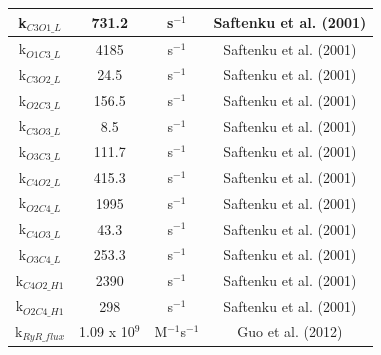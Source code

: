 \documentclass[12pt]{ucsddissertation}
\begin{document}
\begin{table}[h]
\begin{tabular}{cccc}
\hline
k$_{C3O1\_L}$ & 731.2 & s$^{-1}$ & Saftenku et al. (2001) \\
\hline
k$_{O1C3\_L}$ & 4185 & s$^{-1}$ & Saftenku et al. (2001) \\
\hline
k$_{C3O2\_L}$ & 24.5 & s$^{-1}$ & Saftenku et al. (2001) \\
\hline
k$_{O2C3\_L}$ & 156.5 & s$^{-1}$ & Saftenku et al. (2001) \\
\hline
k$_{C3O3\_L}$ & 8.5 & s$^{-1}$ & Saftenku et al. (2001) \\
\hline
k$_{O3C3\_L}$ & 111.7 & s$^{-1}$ & Saftenku et al. (2001) \\
\hline
k$_{C4O2\_L}$ & 415.3 & s$^{-1}$ & Saftenku et al. (2001) \\
\hline
k$_{O2C4\_L}$ & 1995 & s$^{-1}$ & Saftenku et al. (2001) \\
\hline
k$_{C4O3\_L}$ & 43.3 & s$^{-1}$ & Saftenku et al. (2001) \\
\hline
k$_{O3C4\_L}$ & 253.3 & s$^{-1}$ & Saftenku et al. (2001) \\
\hline
k$_{C4O2\_H1}$ & 2390 & s$^{-1}$ & Saftenku et al. (2001) \\
\hline
k$_{O2C4\_H1}$ & 298 & s$^{-1}$ & Saftenku et al. (2001) \\
\hline
k$_{RyR\_flux}$ & 1.09 x 10$^{9}$ & M$^{-1}$s$^{-1}$ & Guo 
et al. (2012) \\
\hline
\end{tabular}
\end{table}
\end{document}
